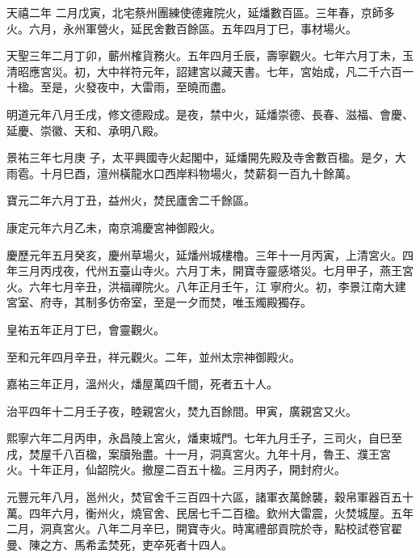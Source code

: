 \begin{pinyinscope}
 天禧二年
 二月戊寅，北宅蔡州團練使德雍院火，延燔數百區。三年春，京師多火。六月，永州軍營火，延民舍數百餘區。五年四月丁巳，事材場火。



 天聖三年二月丁卯，蘄州榷貨務火。五年四月壬辰，壽寧觀火。七年六月丁未，玉清昭應宮災。初，大中祥符元年，詔建宮以藏天書。七年，宮始成，凡二千六百一十楹。至是，火發夜中，大雷雨，至曉而盡。



 明道元年八月壬戌，修文德殿成。是夜，禁中火，延燔崇德、長春、滋福、會慶、延慶、崇徽、天和、承明八殿。



 景祐三年七月庚
 子，太平興國寺火起閣中，延燔開先殿及寺舍數百楹。是夕，大雨雹。十月巳酉，澶州橫龍水口西岸料物場火，焚薪芻一百九十餘萬。



 寶元二年六月丁丑，益州火，焚民廬舍二千餘區。



 康定元年六月乙未，南京鴻慶宮神御殿火。



 慶歷元年五月癸亥，慶州草場火，延燔州城樓櫓。三年十一月丙寅，上清宮火。四年三月丙戌夜，代州五臺山寺火。六月丁未，開寶寺靈感塔災。七月甲子，燕王宮火。六年七月辛丑，洪福禪院火。八年正月壬午，江
 寧府火。初，李景江南大建宮室、府寺，其制多仿帝室，至是一夕而焚，唯玉燭殿獨存。



 皇祐五年正月丁巳，會靈觀火。



 至和元年四月辛丑，祥元觀火。二年，並州太宗神御殿火。



 嘉祐三年正月，溫州火，燔屋萬四千間，死者五十人。



 治平四年十二月壬子夜，睦親宮火，焚九百餘間。甲寅，廣親宮又火。



 熙寧六年二月丙申，永昌陵上宮火，燔東城門。七年九月壬子，三司火，自巳至戌，焚屋千八百楹，案牘殆盡。十一月，洞真宮火。九年十月，魯王、濮王宮
 火。十年正月，仙韶院火。撤屋二百五十楹。三月丙子，開封府火。



 元豐元年八月，邕州火，焚官舍千三百四十六區，諸軍衣萬餘襲，穀帛軍器百五十萬。四年六月，衡州火，燒官舍、民居七千二百楹。欽州大雷震，火焚城屋。五年二月，洞真宮火。八年二月辛巳，開寶寺火。時寓禮部貢院於寺，點校試卷官翟曼、陳之方、馬希孟焚死，吏卒死者十四人。




\end{pinyinscope}
